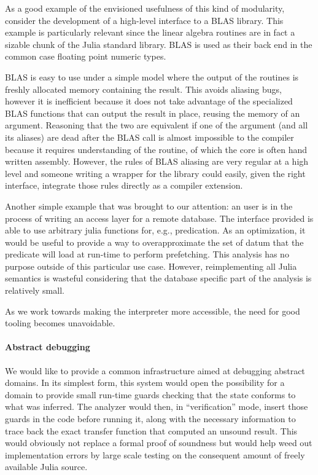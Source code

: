 \documentclass[11pt]{article}
\begin{document}
As a good example of the envisioned usefulness of this kind of modularity, consider the development of a high-level interface to a BLAS library.
This example is particularly relevant since the linear algebra routines are in fact a sizable chunk of the Julia standard library. BLAS is used as their back end in the common case floating point numeric types.

BLAS is easy to use under a simple model where the output of the routines is freshly allocated memory containing the result. This avoids aliasing bugs, however it is inefficient because it does not take advantage of the specialized BLAS functions that can output the result in place, reusing the memory of an argument. Reasoning that the two are equivalent if one of the argument (and all its aliases) are dead after the BLAS call is almost impossible to the compiler because it requires understanding of the routine, of which the core is often hand written assembly.
However, the rules of BLAS aliasing are very regular at a high level and someone writing a wrapper for the library could easily, given the right interface, integrate those rules directly as a compiler extension.

Another simple example that was brought to our attention: an user is in the process of writing an access layer for a remote database.
The interface provided is able to use arbitrary julia functions for, e.g., predication.
As an optimization, it would be useful to provide a way to overapproximate the set of datum that the predicate will load at run-time to perform prefetching.
This analysis has no purpose outside of this particular use case.
However, reimplementing all Julia semantics is wasteful considering that the database specific part of the analysis is relatively small.

As we work towards making the interpreter more accessible, the need for good tooling becomes unavoidable.

\paragraph{Abstract debugging} We would like to provide a common infrastructure aimed at debugging abstract domains.
In its simplest form, this system would open the possibility for a domain to provide small run-time guards checking that the state conforms to what was inferred.
The analyzer would then, in ``verification'' mode, insert those guards in the code before running it, along with the necessary information to trace back the exact transfer function that computed an unsound result.
This would obviously not replace a formal proof of soundness but would help weed out implementation errors by large scale testing on the consequent amount of freely available Julia source.
\end{document}
